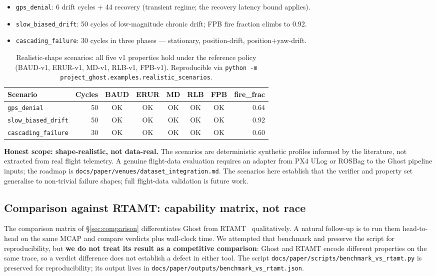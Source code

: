 \documentclass[acmsmall,nonacm=true,review=false]{acmart}
\theoremstyle{plain}
\begin{document}
\begin{itemize}[noitemsep,topsep=2pt]
  \item \texttt{gps\_denial}: 6 drift cycles + 44 recovery
        (transient regime; the recovery latency bound applies).
  \item \texttt{slow\_biased\_drift}: 50 cycles of low-magnitude
        chronic drift; FPB fire fraction climbs to 0.92.
  \item \texttt{cascading\_failure}: 30 cycles in three phases —
        stationary, position-drift, position+yaw-drift.
\end{itemize}

\begin{table}[h]
\centering
\small
\begin{tabular}{lrcccccr}
\toprule
\textbf{Scenario} & \textbf{Cycles} & \textbf{BAUD} & \textbf{ERUR} & \textbf{MD} & \textbf{RLB} & \textbf{FPB} & \textbf{fire\_frac} \\
\midrule
\texttt{gps\_denial}         & 50 & OK & OK & OK & OK & OK & 0.64 \\
\texttt{slow\_biased\_drift} & 50 & OK & OK & OK & OK & OK & 0.92 \\
\texttt{cascading\_failure}  & 30 & OK & OK & OK & OK & OK & 0.60 \\
\bottomrule
\end{tabular}
\caption{Realistic-shape scenarios: all five v1 properties hold
under the reference policy (BAUD-v1, ERUR-v1, MD-v1, RLB-v1,
FPB-v1). Reproducible via
\texttt{python -m project\_ghost.examples.realistic\_scenarios}.}
\label{tab:realistic}
\end{table}

\textbf{Honest scope: shape-realistic, not data-real.} The
scenarios are deterministic synthetic profiles informed by the
literature, not extracted from real flight telemetry. A genuine
flight-data evaluation requires an adapter from PX4 ULog or
ROSBag to the Ghost pipeline inputs; the roadmap is
\texttt{docs/paper/venues/dataset\_integration.md}. The scenarios
here establish that the verifier and property set generalise to
non-trivial failure shapes; full flight-data validation is future
work.

\subsection{Comparison against RTAMT: capability matrix, not race}
\label{sec:rtamt-bench}

The comparison matrix of \S\ref{sec:comparison} differentiates
Ghost from RTAMT~\cite{nikovic2020rtamt} qualitatively. A natural
follow-up is to run them head-to-head on the same MCAP and compare
verdicts plus wall-clock time. We attempted that benchmark and
preserve the script for reproducibility, but \textbf{we do not
treat its result as a competitive comparison}: Ghost and RTAMT
encode different properties on the same trace, so a verdict
difference does not establish a defect in either tool. The script
\texttt{docs/paper/scripts/benchmark\_vs\_rtamt.py} is preserved
for reproducibility; its output lives in
\texttt{docs/paper/outputs/benchmark\_vs\_rtamt.json}.
\end{document}
